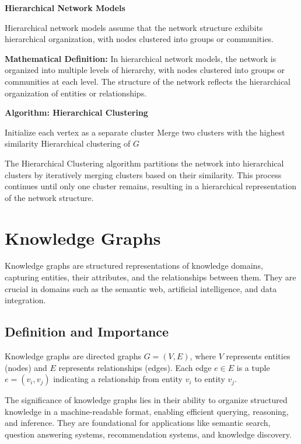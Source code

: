 \documentclass[12pt]{book} %
\begin{document}
\textbf{Hierarchical Network Models}

Hierarchical network models assume that the network structure exhibits hierarchical organization, with nodes clustered into groups or communities.

\textbf{Mathematical Definition:} In hierarchical network models, the network is organized into multiple levels of hierarchy, with nodes clustered into groups or communities at each level. The structure of the network reflects the hierarchical organization of entities or relationships.

\textbf{Algorithm: Hierarchical Clustering}
\FloatBarrier
\begin{algorithm}
\caption{Hierarchical Clustering}
\begin{algorithmic}[1]
\State Initialize each vertex as a separate cluster
    \State Merge two clusters with the highest similarity
\EndWhile
\State \Return Hierarchical clustering of $G$
\EndFunction
\end{algorithmic}
\end{algorithm}
\FloatBarrier
The Hierarchical Clustering algorithm partitions the network into hierarchical clusters by iteratively merging clusters based on their similarity. This process continues until only one cluster remains, resulting in a hierarchical representation of the network structure.



\section{Knowledge Graphs}

Knowledge graphs are structured representations of knowledge domains, capturing entities, their attributes, and the relationships between them. They are crucial in domains such as the semantic web, artificial intelligence, and data integration.

\subsection{Definition and Importance}

Knowledge graphs are directed graphs \(G = (V, E)\), where \(V\) represents entities (nodes) and \(E\) represents relationships (edges). Each edge \(e \in E\) is a tuple \(e = (v_i, v_j)\) indicating a relationship from entity \(v_i\) to entity \(v_j\).

The significance of knowledge graphs lies in their ability to organize structured knowledge in a machine-readable format, enabling efficient querying, reasoning, and inference. They are foundational for applications like semantic search, question answering systems, recommendation systems, and knowledge discovery.
\end{document}

